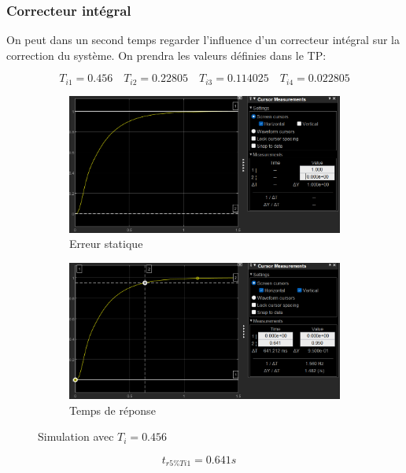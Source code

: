 \documentclass[12pt, a4paper]{report}
\begin{document}
\subsubsection{Correcteur intégral}
On peut dans un second temps regarder l'influence d'un correcteur intégral sur la correction du système. On prendra les valeurs définies dans le TP:

\[
    T_{i1} = 0.456 \quad T_{i2} = 0.22805 \quad T_{i3} = 0.114025 \quad T_{i4} = 0.022805
\]

\begin{figure}[H]
    \begin{subfigure}[h!]{0.4\linewidth}
        \includegraphics[width=\linewidth]{sim2ti1erreur.png}
        \caption{Erreur statique}
    \end{subfigure}
    \hfill    
    \begin{subfigure}[h!]{0.4\linewidth}
        \includegraphics[width=\linewidth]{sim2ti1tr.png}
        \caption{Temps de réponse}
    \end{subfigure}
    \caption{Simulation avec $T_i = 0.456$}
    \label{fig:sim2KTi1}
\end{figure}

\[
    t_{r5\%Ti1} = 0.641s \quad
\]
\end{document}

